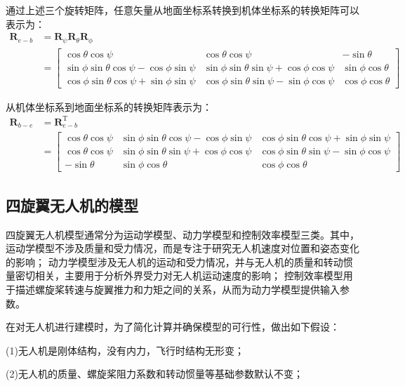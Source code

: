 \documentclass[lang=chs, degree=master, blindreview=false, winfonts=true]{yanputhesis}
\begin{document}
通过上述三个旋转矩阵，任意矢量从地面坐标系转换到机体坐标系的转换矩阵可以表示为：
$$\begin{aligned}\boldsymbol{R}_{e-b}&=\boldsymbol{R}_{\psi}\boldsymbol{R}_{\theta}\boldsymbol{R}_{\phi}\\&=\begin{bmatrix}\cos\theta\cos\psi&\cos\theta\cos\psi&-\sin\theta\\\sin\phi\sin\theta\cos\psi-\cos\phi\sin\psi&\sin\phi\sin\theta\sin\psi+\cos\phi\cos\psi&\sin\phi\cos\theta\\\cos\phi\sin\theta\cos\psi+\sin\phi\sin\psi&\cos\phi\sin\theta\sin\psi-\sin\phi\cos\psi&\cos\phi\cos\theta\end{bmatrix}\end{aligned}$$

从机体坐标系到地面坐标系的转换矩阵表示为：
$$\begin{aligned}\boldsymbol{R}_{b-e}&=\bm{R}_{e-b}^\mathrm{T}\\&=\begin{bmatrix}\cos\theta\cos\psi&\sin\phi\sin\theta\cos\psi-\cos\phi\sin\psi&\cos\phi\sin\theta\cos\psi+\sin\phi\sin\psi\\\cos\theta\cos\psi&\sin\phi\sin\theta\sin\psi+\cos\phi\cos\psi&\cos\phi\sin\theta\sin\psi-\sin\phi\cos\psi\\-\sin\theta&\sin\phi\cos\theta&\cos\phi\cos\theta\end{bmatrix}\end{aligned}$$

\subsection{四旋翼无人机的模型}
四旋翼无人机模型通常分为运动学模型、动力学模型和控制效率模型三类。其中，
运动学模型不涉及质量和受力情况，而是专注于研究无人机速度对位置和姿态变化的影响；
动力学模型涉及无人机的运动和受力情况，并与无人机的质量和转动惯量密切相关，主要用于分析外界受力对无人机运动速度的影响；
控制效率模型用于描述螺旋桨转速与旋翼推力和力矩之间的关系，从而为动力学模型提供输入参数。

在对无人机进行建模时，为了简化计算并确保模型的可行性，做出如下假设：

(1)无人机是刚体结构，没有内力，飞行时结构无形变；

(2)无人机的质量、螺旋桨阻力系数和转动惯量等基础参数默认不变；
\end{document}
